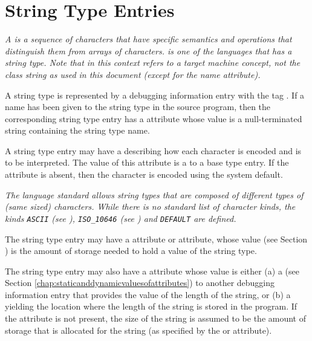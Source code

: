 \section{String Type Entries}
\label{chap:stringtypeentries}

\textit{A  is a sequence of characters that have specific
semantics and operations that distinguish them from arrays of
characters.
 is one of the languages that has a string
type. Note that  in this context refers to a target
machine concept, not the class string as used in this document
(except for the name attribute).}

A string type is represented by a debugging information entry
with the tag \DWTAGstringtypeTARG.
If a name has been given to
the string type in the source program, then the corresponding
string type entry has a
\DWATname{} attribute
whose value is a null-terminated string containing the string type name.

A string type entry may have a \DWATtypeDEFN{}
describing how each character is encoded and is to be interpreted.
The value of this attribute is a \CLASSreference{} to a
\DWTAGbasetype{} base type entry.  If the attribute is absent,
then the character is encoded using the system default.

\textit{The
 language standard allows string
types that are composed of different types of (same sized) characters.
While there is no standard list of character kinds, the kinds
\texttt{ASCII} (see \DWATEASCII),
\texttt{ISO\_10646}
(see \DWATEUCS) and
\texttt{DEFAULT}
are defined.}

The string type entry may have a
\DWATbytesize{} attribute or
\DWATbitsize{}
attribute, whose value
(see Section )
is the amount of
storage needed to hold a value of the string type.

The\hypertarget{chap:DWATstringlengthstringlengthofstringtype}{}
string type entry may also have a
\DWATstringlengthDEFN{} attribute
whose value is either
\bb
(a)
\eb
a 
(see Section \ref{chap:staticanddynamicvaluesofattributes})
\bb
to another debugging information entry that provides the
value of
\eb
the length of the
\bb
string, or (b)
\eb
a  yielding the location
where the length of the string is stored in the program.
If the \DWATstringlengthNAME{} attribute is not present, the size
of the string is assumed to be the amount of storage that is
allocated for the string (as specified by the \DWATbytesize{}
or \DWATbitsize{} attribute).

